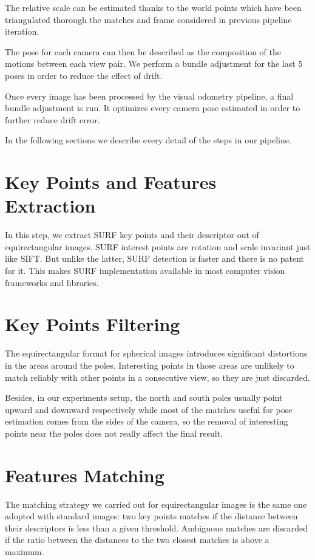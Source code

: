 The relative scale can be estimated thanks to the world points which have been 
triangulated thorough the matches and frame considered in previous pipeline 
iteration.

The pose for each camera can then be described as the composition of the 
motions between each view pair. We perform a bundle adjustment for the last 5 
poses in order to reduce the effect of drift.

Once every image has been processed by the visual odometry pipeline, a final 
bundle adjustment is run. It optimizes every camera pose estimated in order to 
further reduce drift error.

In the following sections we describe every detail of the steps in our pipeline.

\section{Key Points and Features Extraction}
In this step, we extract SURF key points and their descriptor out of 
equirectangular images. SURF 
interest points are rotation and scale invariant just like SIFT. But unlike 
the latter, SURF detection is faster and there is no patent for it. 
This makes SURF implementation available in most computer vision frameworks and 
libraries.

\section{Key Points Filtering}
The equirectangular format for spherical images introduces significant 
distortions in the areas around the poles. Interesting points in those areas 
are unlikely to match reliably with other points in a consecutive view, 
so they are just discarded.

Besides, in our experiments setup, the north and south poles usually point 
upward and downward respectively while most of the matches useful for pose 
estimation comes from the sides of the camera, so the removal of interesting 
points near the poles does not really affect the final result.

\section{Features Matching}
The matching strategy we carried out for equirectangular images is the same one 
adopted with standard images: two key points matches if the distance between 
their descriptors is less than a given threshold. Ambiguous matches 
are discarded if the ratio between the distances to the two closest matches is 
above a maximum.

